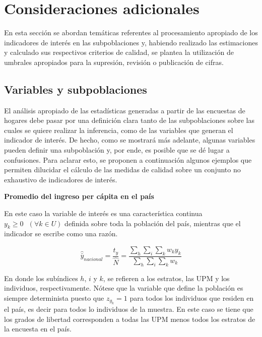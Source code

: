 \documentclass[
  12pt,
  spanish,
]{book}
\begin{document}
\hypertarget{consideraciones-adicionales}{%
\section{Consideraciones adicionales}\label{consideraciones-adicionales}}

En esta sección se abordan temáticas referentes al procesamiento apropiado de los indicadores de interés en las subpoblaciones y, habiendo realizado las estimaciones y calculado sus respectivos criterios de calidad, se plantea la utilización de umbrales apropiados para la supresión, revisión o publicación de cifras.

\hypertarget{variables-y-subpoblaciones}{%
\subsection{Variables y subpoblaciones}\label{variables-y-subpoblaciones}}

El análisis apropiado de las estadísticas generadas a partir de las encuestas de hogares debe pasar por una definición clara tanto de las subpoblaciones sobre las cuales se quiere realizar la inferencia, como de las variables que generan el indicador de interés. De hecho, como se mostrará más adelante, algunas variables pueden definir una subpoblación y, por ende, es posible que se dé lugar a confusiones. Para aclarar esto, se proponen a continuación algunos ejemplos que permiten dilucidar el cálculo de las medidas de calidad sobre un conjunto no exhaustivo de indicadores de interés.

\textbf{Promedio del ingreso per cápita en el país}

En este caso la variable de interés es una característica continua \(y_k \geq 0 \ \ \ (\forall k \in U)\) definida sobre toda la población del país, mientras que el indicador se escribe como una razón.

\[
\hat {\bar y}_{nacional} = \frac{\hat t_y}{\hat N} =\frac{\sum_h\sum_i\sum_k w_ky_{k}}{\sum_h\sum_i\sum_k w_k}
\]

En donde los subíndices \(h\), \(i\) y \(k\), se refieren a los estratos, las UPM y los individuos, respectivamente. Nótese que la variable que define la población es siempre determinista puesto que \(z_{g_k} = 1\) para todos los individuos que residen en el país, es decir para todos lo individuos de la muestra. En este caso se tiene que los grados de libertad corresponden a todas las UPM menos todos los estratos de la encuesta en el país.
\end{document}

